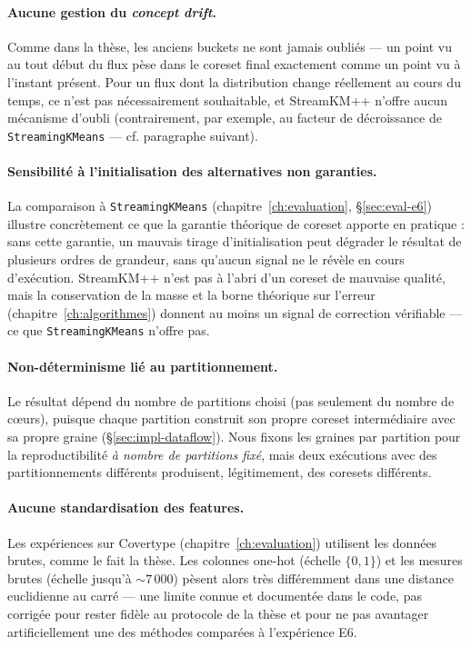 \paragraph{Aucune gestion du \emph{concept drift}.} Comme dans la thèse, les
anciens buckets ne sont jamais oubliés --- un point vu au tout début du flux
pèse dans le coreset final exactement comme un point vu à l'instant présent.
Pour un flux dont la distribution change réellement au cours du temps, ce
n'est pas nécessairement souhaitable, et StreamKM++ n'offre aucun mécanisme
d'oubli (contrairement, par exemple, au facteur de décroissance de
\texttt{StreamingKMeans} --- cf. paragraphe suivant).

\paragraph{Sensibilité à l'initialisation des alternatives non garanties.}
La comparaison à \texttt{StreamingKMeans} (chapitre~\ref{ch:evaluation},
§\ref{sec:eval-e6}) illustre concrètement ce que la garantie théorique de
coreset apporte en pratique : sans cette garantie, un mauvais tirage
d'initialisation peut dégrader le résultat de plusieurs ordres de grandeur,
sans qu'aucun signal ne le révèle en cours d'exécution. StreamKM++ n'est pas
à l'abri d'un coreset de mauvaise qualité, mais la conservation de la masse
et la borne théorique sur l'erreur (chapitre~\ref{ch:algorithmes}) donnent
au moins un signal de correction vérifiable --- ce que \texttt{StreamingKMeans}
n'offre pas.

\paragraph{Non-déterminisme lié au partitionnement.} Le résultat dépend du
nombre de partitions choisi (pas seulement du nombre de c\oe{}urs), puisque
chaque partition construit son propre coreset intermédiaire avec sa propre
graine (§\ref{sec:impl-dataflow}). Nous fixons les graines par partition
pour la reproductibilité \emph{à nombre de partitions fixé}, mais deux
exécutions avec des partitionnements différents produisent, légitimement,
des coresets différents.

\paragraph{Aucune standardisation des features.} Les expériences sur
Covertype (chapitre~\ref{ch:evaluation}) utilisent les données brutes,
comme le fait la thèse. Les colonnes one-hot (échelle $\{0,1\}$) et les
mesures brutes (échelle jusqu'à $\sim 7\,000$) pèsent alors très
différemment dans une distance euclidienne au carré --- une limite connue
et documentée dans le code, pas corrigée pour rester fidèle au protocole de
la thèse et pour ne pas avantager artificiellement une des méthodes
comparées à l'expérience E6.
